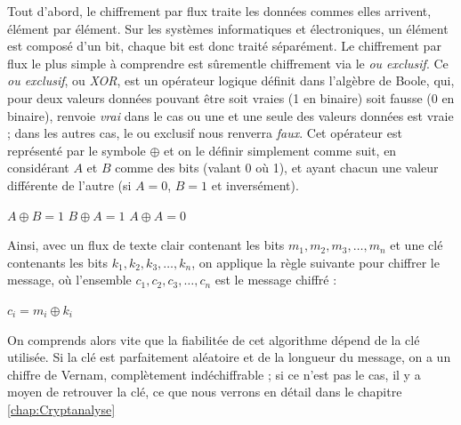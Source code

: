 \label{syst:XOR}
Tout d'abord, le chiffrement par flux traite les données commes elles
arrivent, élément par élément. Sur les systèmes informatiques et
électroniques, un élément est composé d'un bit, chaque bit est donc
traité séparément. Le chiffrement par flux le plus simple à comprendre
est sûrementle chiffrement via le \emph{ou exclusif}. Ce \emph{ou
  exclusif}, ou \emph{XOR}, est un opérateur logique définit dans
l'algèbre de Boole, qui, pour deux valeurs données pouvant être soit
vraies (1 en binaire) soit fausse (0 en binaire), renvoie \emph{vrai}
dans le cas ou une et une seule des valeurs données est vraie ; dans
les autres cas, le ou exclusif nous renverra \emph{faux}. Cet
opérateur est représenté par le symbole $\oplus$ et on le définir
simplement comme suit, en considérant $A$ et $B$ comme des bits (valant 0
où 1), et ayant chacun une valeur différente de l'autre (si $A=0$,
$B=1$ et inversément).
\begin{center}
  $A \oplus B = 1$ \hspace{1.5cm} $B \oplus A = 1$ \hspace{1.5cm} $A
\oplus A = 0$ 
\end{center} 

Ainsi, avec un flux de texte clair contenant les bits $m_1,
m_2, m_3, \dots, m_n$ et une clé contenants les bits $k_1, k_2, k_3,
\dots, k_n$, on applique la règle suivante pour chiffrer le message,
où l'ensemble $c_1, c_2, c_3, \dots, c_n$ est le message chiffré :
\begin{center}
$c_i = m_i \oplus k_i$
\end{center}

On comprends alors vite que la fiabilitée de cet algorithme dépend de
la clé utilisée. Si la clé est parfaitement aléatoire et de la
longueur du message, on a un chiffre de Vernam, complètement
indéchiffrable ; si ce n'est pas le cas, il y a moyen de retrouver la
clé, ce que nous verrons en détail dans le chapitre \ref{chap:Cryptanalyse}




